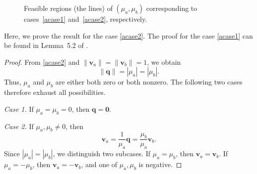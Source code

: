 \documentclass[11pt,reqno]{amsart}
\theoremstyle{definition}
\begin{document}
\begin{figure}[H]
\centering

\begin{minipage}[c]{0.45\textwidth}
\centering
{}
\end{minipage}
\hfill
\begin{minipage}[c]{0.45\textwidth}
\centering
{}
\end{minipage}

\caption{Feasible regions (the lines) of $(\mu_a,\mu_b)$ corresponding to cases~\eqref{acase1} and~\eqref{acase2}, respectively.}
\label{fig:relations}
\end{figure}
Here, we prove the result for the case \eqref{acase2}. The proof for the case \eqref{acase1} can be found in Lemma~5.2 of \cite{wu2025threshold}.

\begin{proof}
From \eqref{acase2} and
$\|\mathbf v_a\|=\|\mathbf v_b\|=1$, we obtain
\[
    \|\boldsymbol q\|=|\mu_a|=|\mu_b|.
\]
Thus, $\mu_a$ and $\mu_b$ are either both zero or both nonzero.
The following two cases therefore exhaust all possibilities.

\textit{Case 1.} If $\mu_a=\mu_b=0$, then
$\boldsymbol q=\mathbf 0$.

\textit{Case 2.} If $\mu_a,\mu_b\ne 0$, then
\[
    \mathbf v_a
    =\frac{1}{\mu_a}\boldsymbol q
    =\frac{\mu_b}{\mu_a}\mathbf v_b.
\]
Since $|\mu_a|=|\mu_b|$, we distinguish two subcases.
If $\mu_a=\mu_b$, then $\mathbf v_a=\mathbf v_b$.
If $\mu_a=-\mu_b$, then $\mathbf v_a=-\mathbf v_b$,
and one of $\mu_a,\mu_b$ is negative.
\end{proof}
\end{document}
